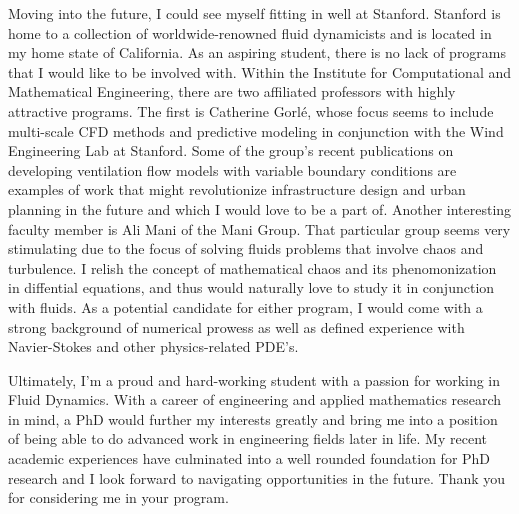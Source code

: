 \documentclass{article}
\begin{document}
Moving into the future, I could see myself fitting in well at Stanford. Stanford is home to a collection of worldwide-renowned fluid dynamicists and is located in my home state of California. As an aspiring student, there is no lack of programs that I would like to be involved with. Within the Institute for Computational and Mathematical Engineering, there are two affiliated professors with highly attractive programs. The first is Catherine Gorl\'e, whose focus seems to include multi-scale CFD methods and predictive modeling in conjunction with the Wind Engineering Lab at Stanford. Some of the group's recent publications on developing ventilation flow models with variable boundary conditions are examples of work that might revolutionize infrastructure design and urban planning in the future and which I would love to be a part of. Another interesting faculty member is Ali Mani of the Mani Group. That particular group seems very stimulating due to the focus of solving fluids problems that involve chaos and turbulence. I relish the concept of mathematical chaos and its phenomonization in diffential equations, and thus would naturally love to study it in conjunction with fluids. As a potential candidate for either program, I would come with a strong background of numerical prowess as well as defined experience with Navier-Stokes and other physics-related PDE's. 

Ultimately, I'm a proud and hard-working student with a passion for working in Fluid Dynamics. With a career of engineering and applied mathematics research in mind, a PhD would further my interests greatly and bring me into a position of being able to do advanced work in engineering fields later in life. My recent academic experiences have culminated into a well rounded foundation for PhD research and I look forward to navigating opportunities in the future. Thank you for considering me in your program. 

\end{document}
